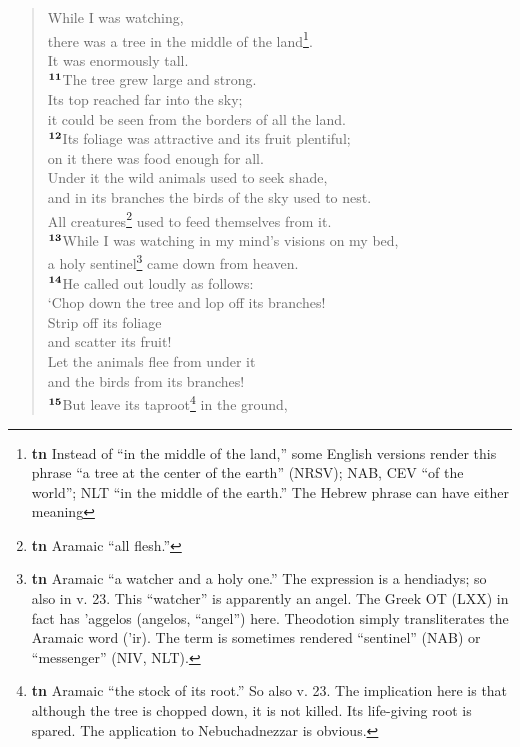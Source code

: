 \documentclass[12pt,a4paper,final]{article}
\newcommand{\textgreek}[1]{\begingroup\fontencoding{LGR}\selectfont#1\endgroup}
\renewcommand{\textsuperscript}[1]{\ensuremath{^{\textbf{\scriptsize #1}}}}
\begin{document}
\begin{quotation}
\noindent While I was watching, \\
there was a tree in the middle of the land\footnote{\textbf{tn} Instead of “in the middle of the land,” some English versions render this phrase “a tree at the center of the earth” (NRSV); NAB, CEV “of the world”; NLT “in the middle of the earth.” The Hebrew phrase can have either meaning}. \\
It was enormously tall. \\
\textsuperscript{11}The tree grew large and strong.\\ 
Its top reached far into the sky; \\
it could be seen from the borders of all the land. \\
\textsuperscript{12}Its foliage was attractive and its fruit plentiful; \\
on it there was food enough for all. \\
Under it the wild animals used to seek shade, \\
and in its branches the birds of the sky used to nest. \\
All creatures\footnote{\textbf{tn} Aramaic “all flesh.”} used to feed themselves from it. \\
\textsuperscript{13}While I was watching in my mind’s visions on my bed, \\
a holy sentinel\footnote{\textbf{tn} Aramaic “a watcher and a holy one.” The expression is a hendiadys; so also in v. 23. This “watcher” is apparently an angel. The Greek OT (LXX) in fact has \textgreek{'aggelos} (angelos, “angel”) here. Theodotion simply transliterates the Aramaic word (’ir). The term is sometimes rendered “sentinel” (NAB) or “messenger” (NIV, NLT).} came down from heaven. \\
\textsuperscript{14}He called out loudly as follows: \\
‘Chop down the tree and lop off its branches! \\
Strip off its foliage \\
and scatter its fruit! \\
Let the animals flee from under it \\
and the birds from its branches! \\
\textsuperscript{15}But leave its taproot\footnote{\textbf{tn} Aramaic “the stock of its root.” So also v. 23. The implication here is that although the tree is chopped down, it is not killed. Its life-giving root is spared. The application to Nebuchadnezzar is obvious.} in the ground, \\

\end{quotation}
\end{document}
